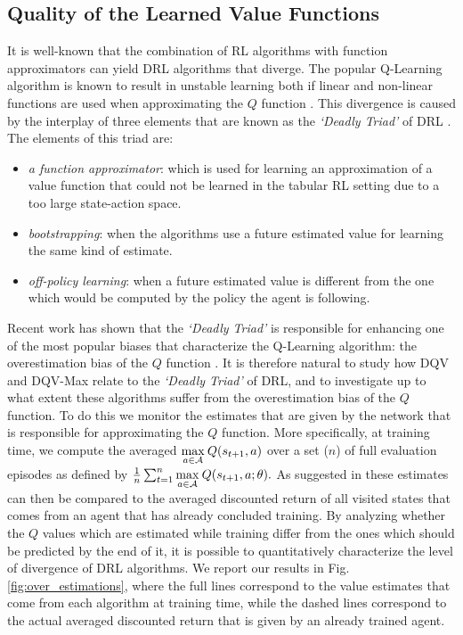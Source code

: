 

\subsection{Quality of the Learned Value Functions}
\label{sec:quality_of_value_functions}

It is well-known that the combination of RL algorithms with function approximators can yield DRL algorithms that diverge. The popular Q-Learning algorithm is known to result in unstable learning both if linear \cite{tsitsiklis1997analysis} and non-linear functions are used when approximating the $Q$ function \cite{van2018deep}. This divergence is caused by the interplay of three elements that are known as the \textit{`Deadly Triad'} of DRL \cite{sutton2018reinforcement}. The elements of this triad are:
\begin{itemize}
    \item \textit{a function approximator}: which is used for learning an approximation of a value function that could not be learned in the tabular RL setting due to a too large state-action space.
    \item \textit{bootstrapping}: when the algorithms use a future estimated value for learning the same kind of estimate.
    \item \textit{off-policy learning}: when a future estimated value is different from the one which would be computed by the policy the agent is following.
\end{itemize}{}

Recent work \cite{van2018deep} has shown that the \textit{`Deadly Triad'} is responsible for enhancing one of the most popular biases that characterize the Q-Learning algorithm: the overestimation bias of the $Q$ function \cite{hasselt2010double}. It is therefore natural to study how DQV and DQV-Max relate to the \textit{`Deadly Triad'} of DRL, and to investigate up to what extent these algorithms suffer from the overestimation bias of the $Q$ function. To do this we monitor the estimates that are given by the network that is responsible for approximating the $Q$ function. More specifically, at training time, we compute the averaged $\underset{a \in \cal A}{\max}\:Q(s_{t+1}, a)$ over a set ($n$) of full evaluation episodes as defined by $\frac{1}{n}\sum_{t=1}^{n}\underset{a \in \cal A}{\max}\:Q(s_{t+1}, a;\theta).$ As suggested in \cite{van2016deep} these estimates can then be compared to the averaged discounted return of all visited states that comes from an agent that has already concluded training. By analyzing whether the $Q$ values which are estimated while training differ from the ones which should be predicted by the end of it, it is possible to quantitatively characterize the level of divergence of DRL algorithms. We report our results in Fig. \ref{fig:over_estimations}, where the full lines correspond to the value estimates that come from each algorithm at training time, while the dashed lines correspond to the actual averaged discounted return that is given by an already trained agent.

